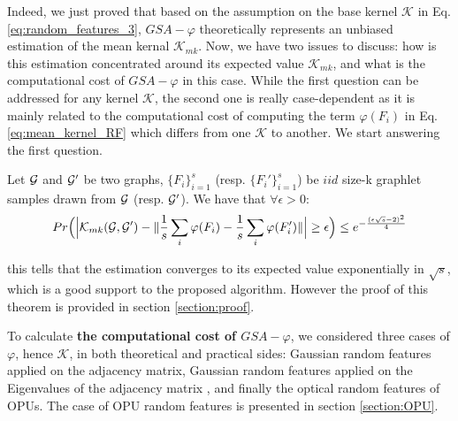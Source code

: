 Indeed, we just proved that based on the assumption on the base kernel $\mathcal{K}$ in Eq. \ref{eq:random_features_3}, $GSA-\varphi$ theoretically represents an unbiased estimation of the mean kernal $\mathcal{K}_{mk}$. Now, we have two issues to discuss: how is this estimation concentrated around its expected value $\mathcal{K}_{mk}$, and what is the computational cost of $GSA-\varphi$ in this case. While the first question can be addressed for any kernel $\mathcal{K}$, the second one is really case-dependent as it is mainly related to the computational cost of computing the term $\varphi(F_i)$ in Eq. \ref{eq:mean_kernel_RF} which differs from one $\mathcal{K}$ to another. We start answering the first question.


\begin{theorem}
\label{theorem:concentration}
Let $\mathcal{G}$ and $\mathcal{G}'$ be two graphs, $\{F_i\}_{i=1}^{s}$ (resp. $\{F_i'\}_{i=1}^{s}$) be $iid$ size-k graphlet samples drawn from $\mathcal{G}$ (resp. $\mathcal{G}'$). We have that $\forall \epsilon >0$:
\begin{align*}
    Pr\Big(\Big | \mathcal{K}_{mk}(\mathcal{G},\mathcal{G}') - \| \frac{1}{s} \sum_i \varphi(F_i) - \frac{1}{s} \sum_i \varphi(F'_i)\|\Big | \geq
    \epsilon\Big)\leq e^{-\frac{(\epsilon\sqrt{s}-2)^2}{4}}
\end{align*}
\end{theorem}
this tells that the estimation converges to its expected value exponentially in $\sqrt{s}$, which is a good support to the proposed algorithm. However the proof of this theorem is provided in section \ref{section:proof}.

To calculate \textbf{the computational cost of $GSA-\varphi$}, we considered three cases of $\varphi$, hence $\mathcal{K}$, in both theoretical and practical sides: Gaussian random features applied on the adjacency matrix, Gaussian random features applied on the Eigenvalues of the adjacency matrix , and finally the optical random features of OPUs. The case of OPU random features is presented in section \ref{section:OPU}.\newline
{}



